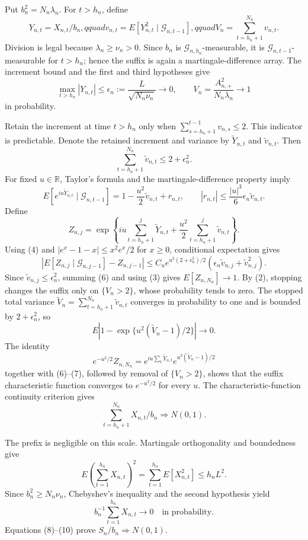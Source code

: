 Put \(b_n^2=N_n\lambda_n\).  For \(t>h_n\), define
\[
 Y_{n,t}=X_{n,t}/b_n,qquad
 v_{n,t}=E[Y_{n,t}^2\mid\mathcal G_{n,t-1}],qquad
 V_n=\sum_{t=h_n+1}^{N_n}v_{n,t}.
\tag{1}
\]
Division is legal because \(\lambda_n\ge\nu_n>0\).  Since \(b_n\) is \(\mathcal G_{n,h_n}\)-measurable, it is \(\mathcal G_{n,t-1}\)-measurable for \(t>h_n\); hence the suffix is again a martingale-difference array.  The increment bound and the first and third hypotheses give
\[
 \max_{t>h_n}|Y_{n,t}|
 \le\epsilon_n:=\frac{L}{\sqrt{N_n\nu_n}}\longrightarrow0,
 \qquad V_n=\frac{A_{n,+}^2}{N_n\lambda_n}\longrightarrow1
\tag{2}
\]
in probability.

Retain the increment at time \(t>h_n\) only when \(\sum_{s=h_n+1}^{t-1}v_{n,s}\le2\).  This indicator is predictable.  Denote the retained increment and variance by \(\widetilde Y_{n,t}\) and \(\widetilde v_{n,t}\).  Then
\[
 \sum_{t=h_n+1}^{N_n}\widetilde v_{n,t}\le2+\epsilon_n^2.
\tag{3}
\]
For fixed \(u\in\mathbb R\), Taylor's formula and the martingale-difference property imply
\[
 E[e^{iu\widetilde Y_{n,t}}\mid\mathcal G_{n,t-1}]
 =1-\frac{u^2}{2}\widetilde v_{n,t}+r_{n,t},
 \qquad |r_{n,t}|\le\frac{|u|^3}{6}\epsilon_n\widetilde v_{n,t}.
\tag{4}
\]
Define
\[
 Z_{n,j}=\exp\!\left\{iu\sum_{t=h_n+1}^j\widetilde Y_{n,t}
 +\frac{u^2}{2}\sum_{t=h_n+1}^j\widetilde v_{n,t}\right\}.
\tag{5}
\]
Using (4) and \(|e^x-1-x|\le x^2e^x/2\) for \(x\ge0\), conditional expectation gives
\[
 \left|E[Z_{n,j}\mid\mathcal G_{n,j-1}]-Z_{n,j-1}\right|
 \le C_u e^{u^2(2+\epsilon_n^2)/2}
 \left(\epsilon_n\widetilde v_{n,j}+\widetilde v_{n,j}^2\right).
\tag{6}
\]
Since \(\widetilde v_{n,j}\le\epsilon_n^2\), summing (6) and using (3) gives \(E[Z_{n,N_n}]\to1\).  By (2), stopping changes the suffix only on \(\{V_n>2\}\), whose probability tends to zero.  The stopped total variance \(\widetilde V_n=\sum_{t=h_n+1}^{N_n}\widetilde v_{n,t}\) converges in probability to one and is bounded by \(2+\epsilon_n^2\), so
\[
 E\left|1-\exp\{u^2(\widetilde V_n-1)/2\}\right|\longrightarrow0.
\tag{7}
\]
The identity
\[
 e^{-u^2/2}Z_{n,N_n}
 =e^{iu\sum_t\widetilde Y_{n,t}}
 e^{u^2(\widetilde V_n-1)/2}
\]
together with (6)--(7), followed by removal of \(\{V_n>2\}\), shows that the suffix characteristic function converges to \(e^{-u^2/2}\) for every \(u\).  The characteristic-function continuity criterion gives
\[
 \sum_{t=h_n+1}^{N_n}X_{n,t}/b_n\Rightarrow N(0,1).
\tag{8}
\]

The prefix is negligible on this scale.  Martingale orthogonality and boundedness give
\[
 E\left(\sum_{t=1}^{h_n}X_{n,t}\right)^2
 =\sum_{t=1}^{h_n}E[X_{n,t}^2]\le h_nL^2.
\tag{9}
\]
Since \(b_n^2\ge N_n\nu_n\), Chebyshev's inequality and the second hypothesis yield
\[
 b_n^{-1}\sum_{t=1}^{h_n}X_{n,t}\longrightarrow0
 \quad\text{in probability}.
\tag{10}
\]
Equations (8)--(10) prove \(S_n/b_n\Rightarrow N(0,1)\).

